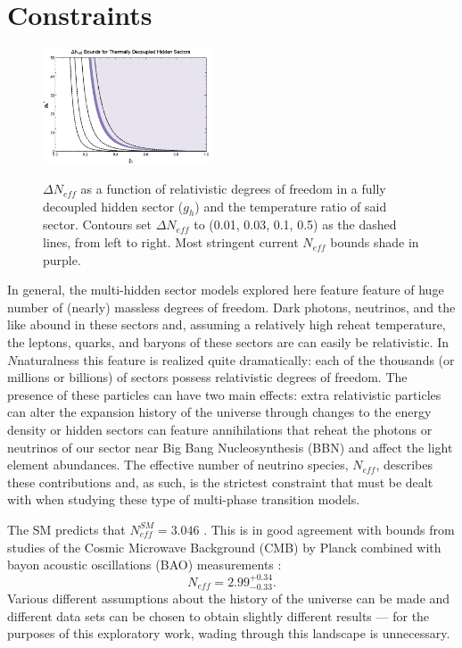 \documentclass[nofootinbib,twocolumn,preprintnumbers]{revtex4-1}
\begin{document}
\section{Constraints}
\label{sec:constraints}

\begin{figure}
\centering
\includegraphics[width=0.45\textwidth]{neff.png}
\label{fig:Neff}
\hfill
\caption{$\Delta N_{eff}$ as a function of relativistic degrees of freedom in a fully decoupled hidden sector ($g_h$) and the temperature ratio of said sector. Contours set $\Delta N_{eff}$ to (0.01, 0.03,  0.1,  0.5) as the dashed lines, from left to right. Most stringent current $N_{eff}$ bounds shade in purple. 
}
\end{figure}


In general, the multi-hidden sector models explored here feature feature of huge number of (nearly) massless degrees of freedom. Dark photons, neutrinos, and the like abound in these sectors and, assuming a relatively high reheat temperature, the leptons, quarks, and baryons of these sectors are can easily be relativistic. In $N$naturalness this feature is realized quite dramatically: each of the thousands (or millions or billions) of sectors possess relativistic degrees of freedom. The presence of these particles can have two main effects: extra relativistic particles can alter the expansion history of the universe through changes to the energy density or hidden sectors can feature annihilations that reheat the photons or neutrinos of our sector near Big Bang Nucleosynthesis (BBN) and affect the light element abundances. The effective number of neutrino species, $N_{eff}$, describes these contributions and, as such, is the strictest constraint that must be dealt with when studying these type of multi-phase transition models. 

 The SM predicts that $N^{SM}_{eff} = 3.046$ \cite{Mangano:2005cc}. This is in good agreement with bounds from studies of the Cosmic Microwave Background (CMB) by Planck combined with bayon acoustic oscillations (BAO) measurements \cite{Aghanim:2018eyx}:
\begin{equation}\label{eqn:NeffBounds}
N_{eff} = 2.99^{+0.34}_{-0.33}.
\end{equation}
Various different assumptions about the history of the universe can be made and different data sets can be chosen to obtain slightly different results \cite{Breitbach:2018ddu} --- for the purposes of this exploratory work, wading through this landscape is unnecessary.
\end{document}
